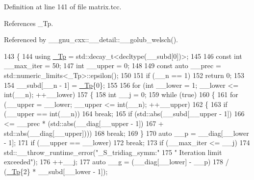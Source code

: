 Definition at line 141 of file matrix.\+tcc.



References \+\_\+\+Tp.



Referenced by \+\_\+\+\_\+gnu\+\_\+cxx\+::\+\_\+\+\_\+detail\+::\+\_\+\+\_\+golub\+\_\+welsch().


\begin{DoxyCode}
143     \{
144       \textcolor{keyword}{using} \hyperlink{namespace____gnu__cxx_a3b19a9c800ca194374ef9172290f7d79}{\_Tp} = std::decay\_t<decltype(\_\_subd[0])>;
145 
146       \textcolor{keyword}{const} \textcolor{keywordtype}{int} \_\_max\_iter = 50;
147       \textcolor{keywordtype}{int} \_\_upper = 0;
148 
149       \textcolor{keyword}{const} \textcolor{keyword}{auto} \_\_prec = std::numeric\_limits<\_Tp>::epsilon();
150 
151       \textcolor{keywordflow}{if} (\_\_n == 1)
152         \textcolor{keywordflow}{return} 0;
153 
154       \_\_subd[\_\_n - 1] = \hyperlink{namespace____gnu__cxx_a3b19a9c800ca194374ef9172290f7d79}{\_Tp}\{0\};
155 
156       \textcolor{keywordflow}{for} (\textcolor{keywordtype}{int} \_\_lower = 1; \_\_lower <= int(\_\_n); ++\_\_lower)
157         \{
158           \textcolor{keywordtype}{int} \_\_j = 0;
159           \textcolor{keywordflow}{while} (\textcolor{keyword}{true})
160             \{
161               \textcolor{keywordflow}{for} (\_\_upper = \_\_lower; \_\_upper <= int(\_\_n); ++\_\_upper)
162                 \{
163                   \textcolor{keywordflow}{if} (\_\_upper == \textcolor{keywordtype}{int}(\_\_n))
164                     \textcolor{keywordflow}{break};
165                   \textcolor{keywordflow}{if} (std::abs(\_\_subd[\_\_upper - 1])
166                         <= \_\_prec * (std::abs(\_\_diag[\_\_upper - 1])
167                                    + std::abs(\_\_diag[\_\_upper])))
168                     \textcolor{keywordflow}{break};
169                 \}
170               \textcolor{keyword}{auto} \_\_p = \_\_diag[\_\_lower - 1];
171               \textcolor{keywordflow}{if} (\_\_upper == \_\_lower)
172                 \textcolor{keywordflow}{break};
173               \textcolor{keywordflow}{if} (\_\_max\_iter <= \_\_j)
174                 std::\_\_throw\_runtime\_error(\textcolor{stringliteral}{"\_S\_tridiag\_symm:"}
175                                            \textcolor{stringliteral}{" Iteration limit exceeded"});
176               ++\_\_j;
177               \textcolor{keyword}{auto} \_\_g = (\_\_diag[\_\_lower] - \_\_p)
178                          / (\hyperlink{namespace____gnu__cxx_a3b19a9c800ca194374ef9172290f7d79}{\_Tp}\{2\} * \_\_subd[\_\_lower - 1]);

\end{DoxyCode}
